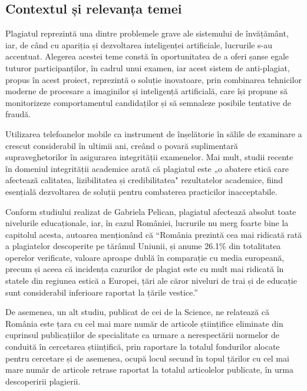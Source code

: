 \documentclass[12pt,a4paper]{article}
\begin{document}
\subsection{Contextul și relevanța temei}

Plagiatul reprezintă una dintre problemele grave ale sistemului de
învățământ, iar, de când cu apariția și dezvoltarea inteligenței
artificiale, lucrurile s-au accentuat. Alegerea acestei teme constă în
oportunitatea de a oferi șanse egale tuturor participanților, în
cadrul unui examen, iar acest sistem de anti-plagiat, propus în acest
proiect, reprezintă o soluție inovatoare, prin combinarea tehnicilor
moderne de procesare a imaginilor și inteligență artificială\cite{russell2020artificial}, care își
propune să monitorizeze comportamentul candidaților și să semnaleze
posibile tentative de fraudă.

Utilizarea telefoanelor mobile ca instrument de înșelătorie în sălile de examinare a crescut
considerabil în ultimii ani, creând o povară suplimentară supraveghetorilor în asigurarea
integrității examenelor\cite{nazari2019detection}. Mai mult, studii recente în domeniul integrității
academice arată că plagiatul este „o abatere etică care afectează calitatea, lizibilitatea și
credibilitatea" rezultatelor academice, fiind esențială dezvoltarea de soluții pentru combaterea
practicilor inacceptabile\cite{zimba2021plagiarism}.

Conform studiului realizat de Gabriela Pelican\cite{pelican2021plagiat}, plagiatul
afectează absolut toate nivelurile educaționale, iar, în cazul
României, lucrurile nu merg foarte bine la capitolul acesta, autoarea
menționând că ``România prezintă cea mai ridicată rată a plagiatelor
descoperite pe tărâmul Uniunii, și anume 26.1\% din totalitatea
operelor verificate, valoare aproape dublă în comparație cu media
europeană, precum și aceea că incidența cazurilor de plagiat este cu
mult mai ridicată în statele din regiunea estică a Europei, țări ale
căror niveluri de trai și de educație sunt considerabil inferioare
raportat la țările vestice.''

De asemenea, un alt studiu\cite{brainard2018massive}, publicat de cei de la Science, ne
relatează că România este țara cu cel mai mare număr de articole
științifice eliminate din cuprinsul publicațiilor de specialitate ca
urmare a nerespectării normelor de conduită în cercetarea științifică,
prin raportare la totalul fondurilor alocate pentru cercetare și de
asemenea, ocupă locul secund în topul țărilor cu cel mai mare număr de
articole retrase raportat la totalul articolelor publicate, în urma
descoperirii plagierii.
\end{document}
